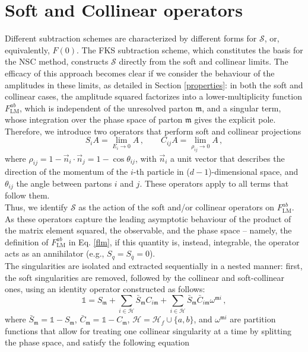 \documentclass[a4paper, 12pt]{book}
\newcommand{\um}{\mathfrak{m}}
\begin{document}
\section{Soft and Collinear operators}
Different subtraction schemes are characterized by different forms for $\mathcal{S}$, or, equivalently, $F(0)$. The FKS subtraction scheme, which constitutes the basis for the NSC method, constructs $\mathcal{S}$ directly from the soft and collinear limits. The efficacy of this approach becomes clear if we consider the behaviour of the amplitudes in these limits, as detailed in Section \ref{properties}: in both the soft and collinear cases, the amplitude squared factorizes into a  lower-multiplicity function $F^{ab}_{\mathrm{LM}}$, which is independent of the unresolved parton $\um$, and a singular term, whose integration over the phase space of parton $\um$ gives the explicit pole. Therefore, we introduce two operators that perform soft and collinear projections
\begin{equation}
    S_i A = \lim_{E_i \to 0} A \, , \qquad C_{ij}A = \lim_{\rho_{ij}\to 0}A \, ,
\end{equation}
where $\rho_{ij}= 1 - \vec{n}_i \cdot \vec{n}_j = 1 - \cos{\theta_{ij}}$, with $\vec{n}_i$ a unit vector that describes the direction of the momentum of the $i$-th particle in ($d-1$)-dimensional space, and $\theta_{ij}$ the angle between partons $i$ and $j$. These operators apply to all terms that follow them. \\
Thus, we identify $\mathcal{S}$ as the action of the soft and/or collinear operators on $F^{ab}_{\mathrm{LM}}$. As these operators capture the leading asymptotic behaviour of the product of the matrix element squared, the observable, and the phase space – namely, the definition of $F^{ab}_{\mathrm{LM}}$ in Eq. \ref{flm}, if this quantity is, instead, integrable, the operator acts as an annihilator (e.g., $S_q = S_{\bar{q}}=0$). \\
The singularities are isolated and extracted sequentially in a nested manner: first, the soft singularities are removed, followed by the collinear and soft-collinear ones, using an identity operator constructed as follows:
\begin{equation}
    \mathbb{1} = S_\um + \sum_{i \in \mathcal{H}} \bar{ S}_\um C_{i\um} + \sum_{i \in \mathcal{H}} \bar{S}_\um \bar{C}_{i \um} \omega^{\um i} \, ,
\end{equation}
where $\bar{ S}_\um= \mathbb{1} - S_\um$, $\bar{ C}_\um= \mathbb{1} - C_\um$, $\mathcal{H} = \mathcal{H}_f \cup \{a,b\}$, and $\omega^{\um i}$ are partition functions that  allow for treating one collinear singularity at a time by splitting the phase space, and satisfy the following equation
\end{document}
